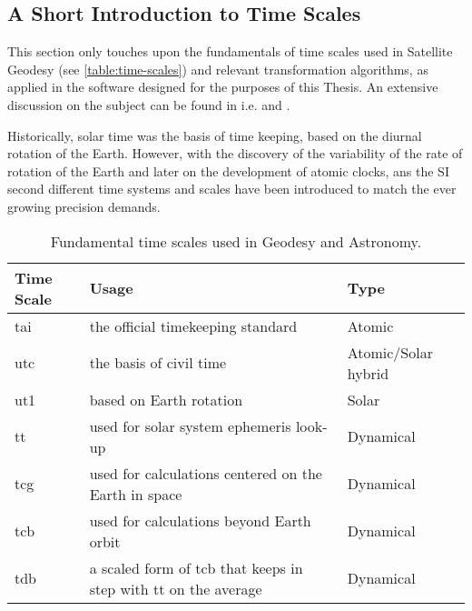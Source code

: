 \subsection{A Short Introduction to Time Scales}\label{ssec:time-scales}

This section only touches upon the fundamentals of time scales used in Satellite Geodesy 
(see \autoref{table:time-scales})  
and relevant transformation algorithms, as applied in the software designed for the 
purposes of this Thesis. An extensive discussion on the subject can be found in i.e. 
\cite{Urban2013} and \cite{sofa2021ts}.

Historically, solar time was the basis of time keeping, based on the diurnal rotation
of the Earth. However, with the  discovery of the variability of the 
rate of rotation of the Earth and later on the development of atomic clocks, 
ans the SI second different time systems and scales have been introduced to match the 
ever growing precision demands.

\begin{table}[h!]
  \centering
  \begin{tabular}{p{7cm}p{5cm}p{1cm}}
      \textbf{Time Scale} & \textbf{Usage} & \textbf{Type} \\
      \hline
      \gls{tai} & the official timekeeping standard & Atomic \\
      \gls{utc} & the basis of civil time & Atomic/Solar hybrid\\
      \gls{ut1} & based on Earth rotation & Solar \\
      \gls{tt}  & used for solar system ephemeris look-up & Dynamical\\
      \gls{tcg} & used for calculations centered on the Earth in space  & Dynamical\\
      \gls{tcb} & used for calculations beyond Earth orbit  & Dynamical\\
      \gls{tdb} & a scaled form of \gls{tcb} that keeps in step with \gls{tt} on the average  & Dynamical\\
      \hline
  \end{tabular}
  \caption{Fundamental time scales used in Geodesy and Astronomy.}
  \label{table:time-scales}
\end{table}

